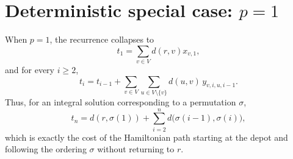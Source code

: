 \documentclass[11pt]{article}
\begin{document}
\section*{Deterministic special case: $p=1$}
When $p=1$, the recurrence collapses to
\[
t_1 = \sum_{v \in V} d(r,v)x_{v,1},
\]
and for every $i \ge 2$,
\[
t_i = t_{i-1} + \sum_{v \in V}\sum_{u \in V \setminus \{v\}} d(u,v)\, y_{v,i,u,i-1}.
\]
Thus, for an integral solution corresponding to a permutation $\sigma$,
\[
t_n = d(r,\sigma(1)) + \sum_{i=2}^n d\bigl(\sigma(i-1),\sigma(i)\bigr),
\]
which is exactly the cost of the Hamiltonian path starting at the depot and following the ordering $\sigma$ without returning to $r$.
\end{document}
